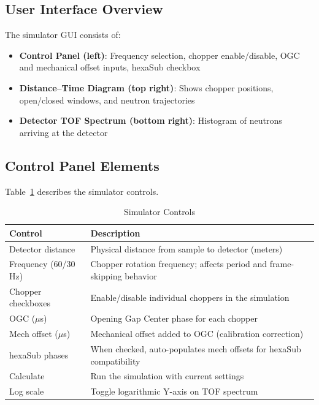 \documentclass[11pt,letterpaper]{article}
\begin{document}
\subsection{User Interface Overview}

The simulator GUI consists of:
\begin{itemize}
    \item \textbf{Control Panel (left)}: Frequency selection, chopper enable/disable, OGC and 
    mechanical offset inputs, hexaSub checkbox
    \item \textbf{Distance--Time Diagram (top right)}: Shows chopper positions, open/closed windows, 
    and neutron trajectories
    \item \textbf{Detector TOF Spectrum (bottom right)}: Histogram of neutrons arriving at the 
    detector
\end{itemize}

\subsection{Control Panel Elements}

Table~\ref{tab:sim_controls} describes the simulator controls.

\begin{table}[h]
\centering
\caption{Simulator Controls}
\label{tab:sim_controls}
\begin{tabular}{lp{9cm}}
\toprule
Control & Description \\
\midrule
Detector distance & Physical distance from sample to detector (meters) \\
Frequency (60/30 Hz) & Chopper rotation frequency; affects period and frame-skipping behavior \\
Chopper checkboxes & Enable/disable individual choppers in the simulation \\
OGC ($\mu$s) & Opening Gap Center phase for each chopper \\
Mech offset ($\mu$s) & Mechanical offset added to OGC (calibration correction) \\
hexaSub phases & When checked, auto-populates mech offsets for hexaSub compatibility \\
Calculate & Run the simulation with current settings \\
Log scale & Toggle logarithmic Y-axis on TOF spectrum \\
\bottomrule
\end{tabular}
\end{table}
\end{document}

